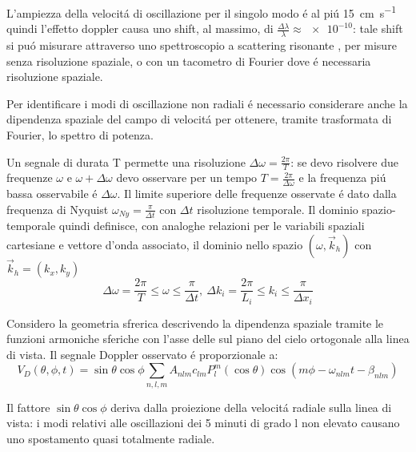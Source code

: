 \documentclass[../main.tex]{subfiles}
\begin{document}
L'ampiezza della velocit\'a di oscillazione per il singolo modo \'e  al pi\'u \SI{15}{\cm\per\second} quindi l'effetto doppler causa uno shift, al massimo, di $\frac{\Delta\lambda}{\lambda}\approx\num{e-10}$: tale shift si pu\'o misurare attraverso uno spettroscopio a scattering risonante  , per misure senza risoluzione spaziale, o con un tacometro di Fourier dove \'e necessaria risoluzione spaziale.


Per identificare i modi di oscillazione non radiali \'e necessario considerare anche la dipendenza spaziale del campo di velocit\'a per ottenere, tramite trasformata di Fourier, lo spettro di potenza.

Un segnale di durata T permette una risoluzione $\Delta\omega=\frac{2\pi}{T}$: se devo risolvere due frequenze $\omega$ e $\omega+\Delta\omega$ devo osservare per un tempo $T=\frac{2\pi}{\Delta\omega}$ e la frequenza pi\'u bassa osservabile \'e $\Delta\omega$. Il limite superiore delle frequenze osservate \'e dato dalla frequenza di Nyquist $\omega_{Ny}=\frac{\pi}{\Delta t}$ con $\Delta t$ risoluzione temporale. Il dominio spazio-temporale quindi definisce, con analoghe relazioni per le variabili spaziali cartesiane e vettore d'onda associato, il dominio nello spazio $(\omega,\vec{k}_h)$ con $\vec{k}_h=(k_x,k_y)$
\begin{equation}
\Delta\omega=\frac{2\pi}{T}\leq\omega\leq\frac{\pi}{\Delta t},\ \Delta k_i=\frac{2\pi}{L_i}\leq k_i\leq\frac{\pi}{\Delta x_i}
\end{equation}

Considero la geometria sfrerica descrivendo la dipendenza spaziale tramite le funzioni armoniche sferiche con l'asse delle sul piano del cielo ortogonale alla linea di vista. Il segnale Doppler osservato \'e proporzionale a:
\begin{equation}
    V_D(\theta,\phi,t)=\sin{\theta}\cos{\phi}\sum_{n,l,m}A_{nlm}c_{lm}P_l^m(\cos{\theta})\cos{(m\phi-\omega_{nlm}t-\beta_{nlm})}
\end{equation}

Il fattore $\sin{\theta}\cos{\phi}$ deriva dalla proiezione della velocit\'a radiale sulla linea di vista: i modi relativi alle oscillazioni dei 5 minuti di grado l non elevato causano uno spostamento quasi totalmente radiale.
\end{document}
